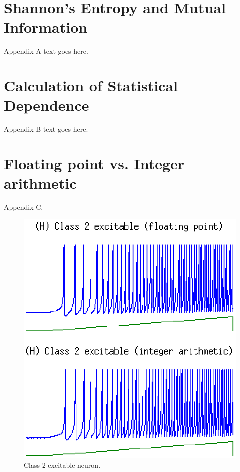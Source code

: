 \documentclass[journal]{./sty/IEEEtran}
\begin{document}
\appendices
\section{Shannon's Entropy and Mutual Information}
Appendix A text goes here.

\section{Calculation of Statistical Dependence}
Appendix B text goes here.

\section{Floating point vs. Integer arithmetic}
Appendix C.

\begin{figure}
\centering
\includegraphics[scale=0.6]{imgs/izh_class_2_excitable}
\caption{Class 2 excitable neuron.}
\end{figure}
\end{document}
